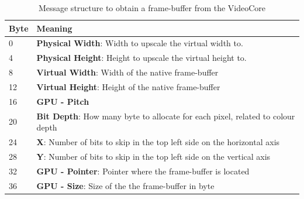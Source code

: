 \begin{table}[H]
    \centering
    \begin{tabular}{| p{3cm} | p{7cm} |}
    \hline
    \textbf{Byte}	&  \textbf{Meaning} \\ \hline
        0                   &  \textbf{Physical Width}: Width to upscale the virtual width to. \\ \hline
    4                   &  \textbf{Physical Height}: Height to upscale the virtual height to. \\ \hline
    8                   &  \textbf{Virtual Width}: Width of the native frame-buffer \\ \hline
    12                  &  \textbf{Virtual Height}: Height of the native frame-buffer \\ \hline
    16                  &  \textbf{GPU - Pitch} \\ \hline
    20                  &  \textbf{Bit Depth}: How many byte to allocate for each pixel, related to colour depth \\ \hline
    24                  &  \textbf{X}: Number of bits to skip in the top left side on the horizontal axis \\ \hline
    28                  &  \textbf{Y}: Number of bits to skip in the top left side on the vertical axis \\ \hline
    32                  &  \textbf{GPU - Pointer}: Pointer where the frame-buffer is located\\ \hline
    36                  &  \textbf{GPU - Size}: Size of the the frame-buffer in byte\\ \hline
    \end{tabular}
    \caption{Message structure to obtain a frame-buffer from the VideoCore}
\end{table}



